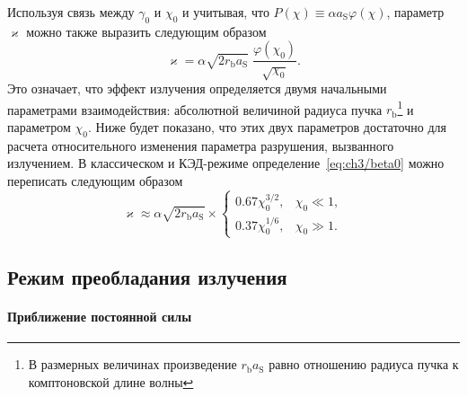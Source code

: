 Используя связь между $\gamma_0$ и $\chi_0$ и учитывая, что $P(\chi)\equiv \alpha a_\mathrm{S} \varphi(\chi)$, параметр $\varkappa $ можно также выразить следующим образом
\begin{equation}
    \label{eq:ch3/beta0}
    \varkappa = \alpha \sqrt{ 2 r_\mathrm{b} a_\mathrm{S} }\; \frac{ \varphi (\chi_0) }{\sqrt{\chi_0}}.
\end{equation}
Это означает, что эффект излучения определяется двумя начальными параметрами взаимодействия: абсолютной величиной радиуса пучка $r_\mathrm{b}$\footnote{В размерных величинах произведение $r_\mathrm{b} a_\mathrm{S}$ равно отношению радиуса пучка к комптоновской длине волны} и параметром $\chi_0$.
Ниже будет показано, что этих двух параметров достаточно для расчета относительного изменения параметра разрушения, вызванного  излучением.
В классическом и КЭД-режиме определение~\eqref{eq:ch3/beta0} можно переписать следующим образом
\begin{equation}
    \varkappa \approx \alpha \sqrt{2 r_\mathrm{b} a_\mathrm{S}}\times
    \begin{cases}
        0.67 \chi_0^{3/2}, & \chi_0 \ll 1, \\
        0.37 \chi_0^{1/6}, & \chi_0 \gg 1.
    \end{cases}
\end{equation}

\subsection{Режим преобладания излучения}
\label{sub:ch3/sec3/Model}

\paragraph{Приближение постоянной силы}

